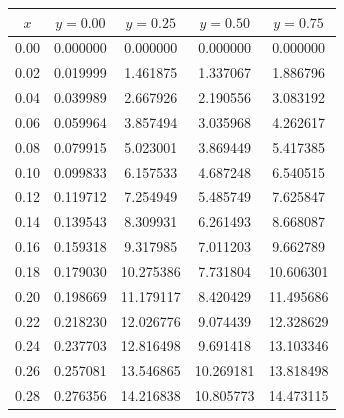 \documentclass[aps,amsmath,amssymb,floatfix]{revtex4}
\begin{document}
\begin{enumerate}
\begin{enumerate}
\begin{table}[H]
\begin{tabular}{|c|c|c|c|c|}
	      	      		\textbf{$x$} & \textbf{$y = 0.00$} & \textbf{$y = 0.25$} & \textbf{$y = 0.50$} & \textbf{$y = 0.75$} \\ \hline
	      	      		0.00         & 0.000000            & 0.000000            & 0.000000            & 0.000000            \\ \hline
	      	      		0.02         & 0.019999            & 1.461875            & 1.337067            & 1.886796            \\ \hline
	      	      		0.04         & 0.039989            & 2.667926            & 2.190556            & 3.083192            \\ \hline
	      	      		0.06         & 0.059964            & 3.857494            & 3.035968            & 4.262617            \\ \hline
	      	      		0.08         & 0.079915            & 5.023001            & 3.869449            & 5.417385            \\ \hline
	      	      		0.10         & 0.099833            & 6.157533            & 4.687248            & 6.540515            \\ \hline
	      	      		0.12         & 0.119712            & 7.254949            & 5.485749            & 7.625847            \\ \hline
	      	      		0.14         & 0.139543            & 8.309931            & 6.261493            & 8.668087            \\ \hline
	      	      		0.16         & 0.159318            & 9.317985            & 7.011203            & 9.662789            \\ \hline
	      	      		0.18         & 0.179030            & 10.275386           & 7.731804            & 10.606301           \\ \hline
	      	      		0.20         & 0.198669            & 11.179117           & 8.420429            & 11.495686           \\ \hline
	      	      		0.22         & 0.218230            & 12.026776           & 9.074439            & 12.328629           \\ \hline
	      	      		0.24         & 0.237703            & 12.816498           & 9.691418            & 13.103346           \\ \hline
	      	      		0.26         & 0.257081            & 13.546865           & 10.269181           & 13.818498           \\ \hline
	      	      		0.28         & 0.276356            & 14.216838           & 10.805773           & 14.473115           \\ \hline

\end{tabular}
\end{table}
\end{enumerate}
\end{enumerate}
\end{document}
